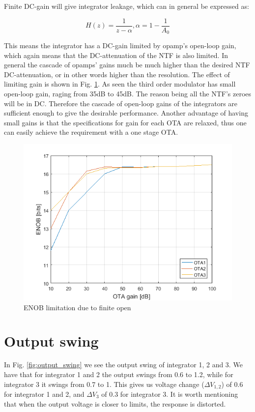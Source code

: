 Finite DC-gain will give integrator leakage, which can in general be expressed as:

\begin{equation}
    H(z) = \frac{1}{z - \alpha}, \alpha = 1 - \frac{1}{A_0}
\end{equation}

This means the integrator has a DC-gain limited by opamp's open-loop gain, which again means that the DC-attenuation of the NTF is also limited. In general the cascade of opamps' gains much be much higher than the desired NTF DC-attenuation, or in other words higher than the resolution. The effect of limiting gain is shown in Fig. \ref{fig:DC_gain_spec}. As seen the third order modulator has small open-loop gain, raging from 35dB to 45dB. The reason being all the NTF's zeroes will be in DC. Therefore the cascade of open-loop gains of the integrators are sufficient enough to give the desirable performance. Another advantage of having small gains is that the specifications for gain for each OTA are relaxed, thus one can easily achieve the requirement with a one stage OTA. 

\begin{figure}[H]
\centering
\includegraphics[scale=0.7]{images/DC_gain_spec.png}
\caption{ENOB limitation due to finite open}
\label{fig:DC_gain_spec}
\end{figure}

\section{Output swing}\label{out_put_swing}
In Fig. \ref{fig:output_swing} we see the output swing of integrator 1, 2 and 3. We have that for integrator 1 and 2 the output swings from 0.6 to 1.2, while for integrator 3 it swings from 0.7 to 1. This gives us voltage change ($\Delta V_{1,2}$) of 0.6 for integrator 1 and 2, and $\Delta V_3$ of 0.3 for integrator 3. It is worth mentioning that when the output voltage is closer to limits, the response is distorted.    

